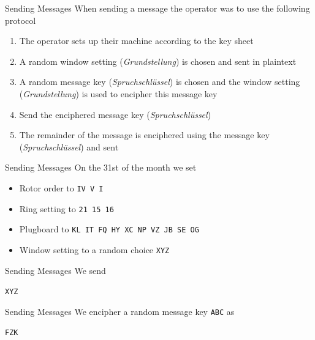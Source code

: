 \documentclass[hyphens,aspectratio=169]{beamer}
\begin{document}
\begin{frame}{Sending Messages}
	When sending a message the operator was to use the following protocol
	\begin{enumerate}
		\item The operator sets up their machine according to the key sheet
		      \pause
		      \vspace{1em}
		\item A random window setting (\emph{Grundstellung}) is chosen and sent in plaintext
		      \pause
		      \vspace{1em}
		\item A random message key (\emph{Spruchschlüssel}) is chosen and the window setting (\emph{Grundstellung}) is used to encipher this message key
        		      \pause
		      \vspace{1em}
        \item Send the enciphered message key (\emph{Spruchschlüssel})
        		      \pause
		      \vspace{1em}
		\item The remainder of the message is enciphered using the message key (\emph{Spruchschlüssel}) and sent
	\end{enumerate}
\end{frame}



\begin{frame}{Sending Messages}
    On the 31st of the month we set 
    \begin{itemize}
        \item Rotor order to \texttt{IV V I}
        \item Ring setting to \texttt{21 15 16}
        \item Plugboard to \texttt{KL IT FQ HY XC NP VZ JB SE OG}
        \item Window setting to a random choice \texttt{XYZ}
    \end{itemize}
\end{frame}

\begin{frame}{Sending Messages}
We send
    \begin{center}
        \texttt{XYZ}
    \end{center}
\end{frame}

\begin{frame}{Sending Messages}
We encipher a random message key \texttt{ABC} as
    \begin{center}
        \texttt{FZK}
    \end{center}
\end{frame}
\end{document}
